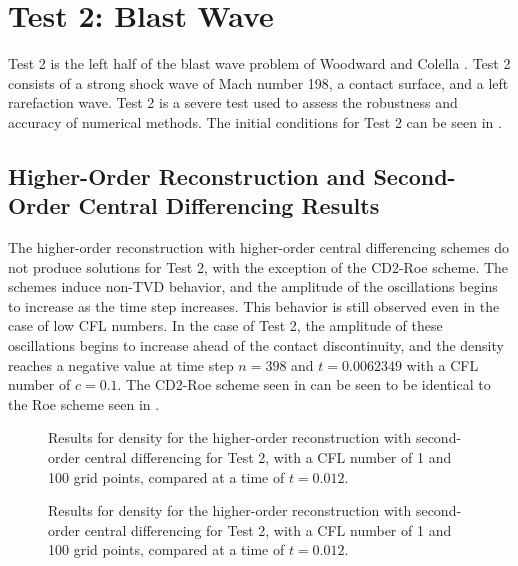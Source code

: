 \section{Test 2: Blast Wave}\label{sect:Test2}
Test 2 is the left half of the blast wave problem of Woodward and Colella \cite{WOODWARD1984115}. Test 2 consists of a strong shock wave of Mach number 198, a contact surface, and a left rarefaction wave. Test 2 is a severe test used to assess the robustness and accuracy of numerical methods. The initial conditions for Test 2 can be seen in .

\subsection{Higher-Order Reconstruction and Second-Order Central Differencing Results}

The higher-order reconstruction with higher-order central differencing schemes do not produce solutions for Test 2, with the exception of the CD2-Roe scheme. The schemes induce non-TVD behavior, and the amplitude of the oscillations begins to increase as the time step increases. This behavior is still observed even in the case of low CFL numbers. In the case of Test 2, the amplitude of these oscillations begins to increase ahead of the contact discontinuity, and the density reaches a negative value at time step $n = 398$ and $t=0.0062349$ with a CFL number of $c=0.1$. The CD2-Roe scheme seen in  can be seen to be identical to the Roe scheme seen in .
\begin{figure}
	\caption[Results for density for the higher-order reconstruction with second-order central differencing for Test 2, with a CFL number of 1 and 100 grid points, compared at a time of $t=0.012$.]{Results for density for the higher-order reconstruction with second-order central differencing for Test 2, with a CFL number of 1 and 100 grid points, compared at a time of $t=0.012$.}
	\label{fig:Test3HORCD2density}
\end{figure}

\begin{figure}
	\caption[Results for density for the higher-order reconstruction with second-order central differencing for Test 2, with a CFL number of 1 and 100 grid points, compared at a time of $t=0.012$.]{Results for density for the higher-order reconstruction with second-order central differencing for Test 2, with a CFL number of 1 and 100 grid points, compared at a time of $t=0.012$.}
	\label{fig:Test3HORCD2velocity}
\end{figure}

